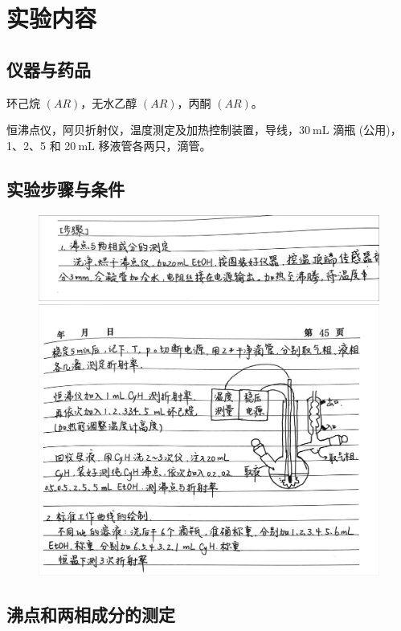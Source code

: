 \section{实验内容\cite{pcl2002,pku2002physicalchem}}

\subsection{仪器与药品}

环己烷 $(A R)$，无水乙醇 $(A R)$，丙酮 $(A R)$。

恒沸点仪，阿贝折射仪，温度测定及加热控制装置，导线，$30 \mathrm{~mL}$ 滴瓶 (公用)，1、2、5 和 20$ \mathrm{~mL}$ 移液管各两只，滴管。

\subsection{实验步骤与条件}

\begin{figure}[H]
   \centering
   \includegraphics[width=.78\textwidth]{figures/0-2-1.jpg}
   \includegraphics[width=.78\textwidth]{figures/0-2-2.jpg}

\end{figure}

\subsection{沸点和两相成分的测定}

